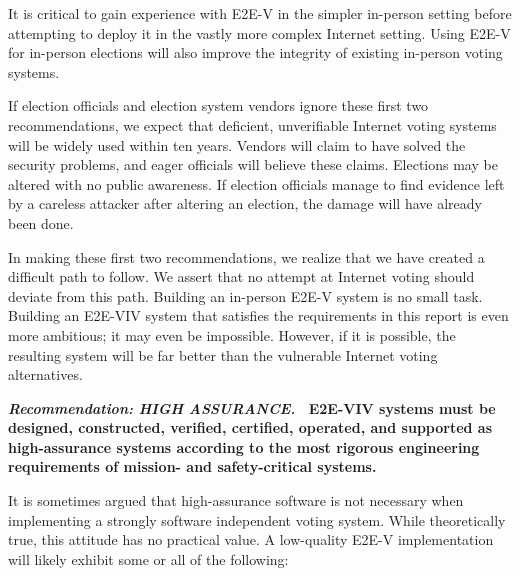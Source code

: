 It is critical to gain experience with E2E-V in the simpler in-person
setting before attempting to deploy it in the vastly more complex
Internet setting. Using E2E-V for in-person elections will also
improve the integrity of existing in-person voting systems.
 
If election officials and election system vendors ignore these first
two recommendations, we expect that deficient, unverifiable Internet
voting systems will be widely used within ten years.  Vendors will
claim to have solved the security problems, and eager officials will
believe these claims.  Elections may be altered with no public
awareness.  If election officials manage to find evidence left by a
careless attacker after altering an election, the damage will have
already been done.
 
In making these first two recommendations, we realize that we have
created a difficult path to follow. We assert that no attempt at
Internet voting should deviate from this path.  Building an in-person
E2E-V system is no small task. Building an E2E-VIV system that
satisfies the requirements in this report is even more ambitious; it
may even be impossible. However, if it is possible, the resulting
system will be far better than the vulnerable Internet voting
alternatives.

\vspace{12pt} 

\textbf{\emph{Recommendation: HIGH ASSURANCE.} \ E2E-VIV systems must
  be designed, constructed, verified, certified, operated, and
  supported as high-assurance systems according to the most rigorous
  engineering requirements of mission- and safety-critical systems.}

It is sometimes argued that high-assurance software is not necessary
when implementing a strongly software independent voting system. While
theoretically true, this attitude has no practical value. A
low-quality E2E-V implementation will likely exhibit some or all of
the following:

